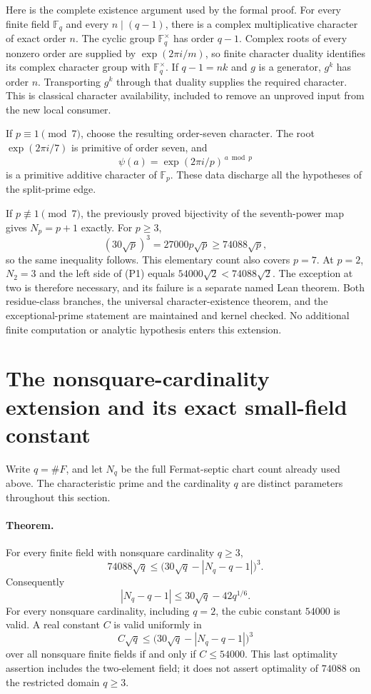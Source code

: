 \documentclass[11pt]{article}
\begin{document}
Here is the complete existence argument used by the formal proof.
For every finite field $\mathbb F_q$ and every $n\mid(q-1)$, there is a
complex multiplicative character of exact order $n$.
The cyclic group $\mathbb F_q^\times$ has order $q-1$.
Complex roots of every nonzero order are supplied by
$\exp(2\pi i/m)$, so finite character duality identifies its
complex character group with $\mathbb F_q^\times$.
If $q-1=nk$ and $g$ is a generator, $g^k$ has order $n$.
Transporting $g^k$ through that duality supplies the required character.
This is classical character availability, included to remove an
unproved input from the new local consumer.

If $p\equiv1\pmod7$, choose the resulting order-seven character.
The root $\exp(2\pi i/7)$ is primitive of order seven, and
\[
 \psi(a)=\exp(2\pi i/p)^{\,a\bmod p}
\]
is a primitive additive character of $\mathbb F_p$.
These data discharge all the hypotheses of the split-prime edge.

If $p\not\equiv1\pmod7$, the previously proved bijectivity of the
seventh-power map gives $N_p=p+1$ exactly. For $p\ge3$,
\[
 (30\sqrt p)^3=27000p\sqrt p\ge74088\sqrt p,
\]
so the same inequality follows. This elementary count also covers $p=7$.
At $p=2$, $N_2=3$ and the left side of (P1) equals
$54000\sqrt2<74088\sqrt2$. The exception at two is therefore necessary,
and its failure is a separate named Lean theorem.
Both residue-class branches, the universal character-existence theorem,
and the exceptional-prime statement are maintained and kernel checked.
No additional finite computation or analytic hypothesis enters this extension.

\section{The nonsquare-cardinality extension and its exact small-field constant}
\label{sec:nonsquare-septic}

Write \(q=\#F\), and let \(N_q\) be the full Fermat-septic chart count
already used above. The characteristic prime and the cardinality \(q\)
are distinct parameters throughout this section.

\paragraph{Theorem.}
For every finite field with nonsquare cardinality \(q\ge3\),
\[
 74088\sqrt q\le
 \bigl(30\sqrt q-|N_q-q-1|\bigr)^3.
\]
Consequently
\[
 |N_q-q-1|\le30\sqrt q-42q^{1/6}.
\]
For every nonsquare cardinality, including \(q=2\), the cubic constant
\(54000\) is valid. A real constant \(C\) is valid uniformly in
\[
 C\sqrt q\le\bigl(30\sqrt q-|N_q-q-1|\bigr)^3
\]
over all nonsquare finite fields if and only if \(C\le54000\).
This last optimality assertion includes the two-element field; it does
not assert optimality of \(74088\) on the restricted domain \(q\ge3\).
\end{document}
